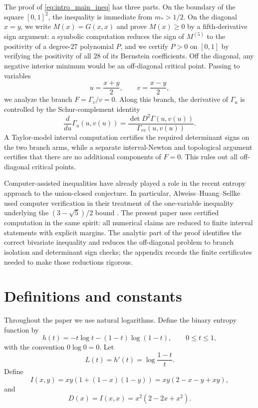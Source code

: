 The proof of \eqref{eq:intro_main_ineq} has three parts.  On the boundary of
the square \([0,1]^2\), the inequality is immediate from \(m_*>1/2\).  On the
diagonal \(x=y\), we write \(M(x)=G(x,x)\) and prove \(M(x)\ge0\) by a
fifth-derivative sign argument: a symbolic computation reduces the sign of
\(M^{(5)}\) to the positivity of a degree-\(27\) polynomial \(P\), and we
certify \(P>0\) on \([0,1]\) by verifying the positivity of all \(28\) of its
Bernstein coefficients.  Off the diagonal, any negative interior minimum would
be an off-diagonal critical point.  Passing to variables
\[
  u=\frac{x+y}{2},
  \qquad
  v=\frac{x-y}{2},
\]
we analyze the branch \(F=\Gamma_v/v=0\).  Along this branch, the derivative of
\(\Gamma_u\) is controlled by the Schur-complement identity
\[
  \frac{d}{du}\Gamma_u(u,v(u))
  =
  \frac{\det D^2\Gamma(u,v(u))}{\Gamma_{vv}(u,v(u))}.
\]
A Taylor-model interval computation certifies the required determinant signs
on the two branch arms, while a separate interval-Newton and topological
argument certifies that there are no additional components of \(F=0\).  This
rules out all off-diagonal critical points.

Computer-assisted inequalities have already played a role in the recent
entropy approach to the union-closed conjecture.  In particular,
Alweiss--Huang--Sellke used computer verification in their treatment of the
one-variable inequality underlying the \((3-\sqrt5)/2\) bound
\cite{AlweissHuangSellke2024}.  The present paper uses certified computation
in the same spirit: all numerical claims are reduced to finite interval
statements with explicit margins.  The analytic part of the proof identifies
the correct bivariate inequality and reduces the off-diagonal problem to
branch isolation and determinant sign checks; the appendix records the finite
certificates needed to make those reductions rigorous.

\section{Definitions and constants}\label{sec:defs}

Throughout the paper we use natural logarithms.  Define the binary entropy function by
\begin{equation}\label{eq:hdef}
  h(t)=-t\log t-(1-t)\log(1-t),
  \qquad 0\le t\le 1,
\end{equation}
with the convention \(0\log0=0\).  Let
\begin{equation}\label{eq:Ldef}
  L(t)=h'(t)=\log\frac{1-t}{t}.
\end{equation}
Define
\begin{equation}\label{eq:Idef}
  I(x,y)=xy(1+(1-x)(1-y))=xy(2-x-y+xy),
\end{equation}
and
\begin{equation}\label{eq:Ddef}
  D(x)=I(x,x)=x^2(2-2x+x^2).
\end{equation}

